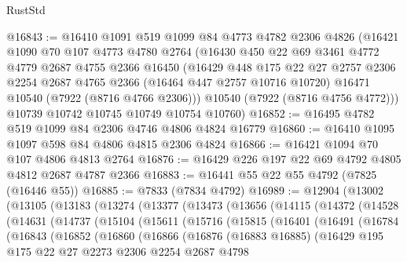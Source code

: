\begin{lexlean}{RustStd}
\begin{coremodule}
@16843 := @16410
    @1091
    @519
    @1099
    @84
    @4773
    @4782
    @2306
    @4826
    (@16421
      @1090
      @70
      @107
      @4773
      @4780
      @2764
      (@16430
        @450
        @22
        @69
        @3461
        @4772
        @4779
        @2687
        @4755
        @2366
        @16450
        (@16429
          @448
          @175
          @22
          @27
          @2757
          @2306
          @2254
          @2687
          @4765
          @2366
          (@16464 @447 @2757 @10716 @10720)
          @16471
          @10540
          (@7922 (@8716 @4766 @2306)))
        @10540
        (@7922 (@8716 @4756 @4772)))
      @10739
      @10742
      @10745
      @10749
      @10754
      @10760)
@16852 := @16495 @4782 @519 @1099 @84 @2306 @4746 @4806 @4824 @16779
@16860 := @16410 @1095 @1097 @598 @84 @4806 @4815 @2306 @4824
@16866 := @16421 @1094 @70 @107 @4806 @4813 @2764
@16876 := @16429 @226 @197 @22 @69 @4792 @4805 @4812 @2687 @4787 @2366
@16883 := @16441 @55 @22 @55 @4792 (@7825 (@16446 @55))
@16885 := @7833 (@7834 @4792)
@16989 := @12904
    (@13002
      (@13105
        (@13183
          (@13274
            (@13377
              (@13473
                (@13656
                  (@14115
                    (@14372
                      (@14528
                        (@14631
                          (@14737
                            (@15104
                              (@15611
                                (@15716
                                  (@15815
                                    (@16401
                                      (@16491
                                        (@16784
                                          (@16843
                                            (@16852
                                              (@16860
                                                (@16866
                                                  (@16876
                                                    (@16883 @16885)
                                                    (@16429
                                                      @195
                                                      @175
                                                      @22
                                                      @27
                                                      @2273
                                                      @2306
                                                      @2254
                                                      @2687
                                                      @4798

\end{coremodule}
\end{lexlean}
